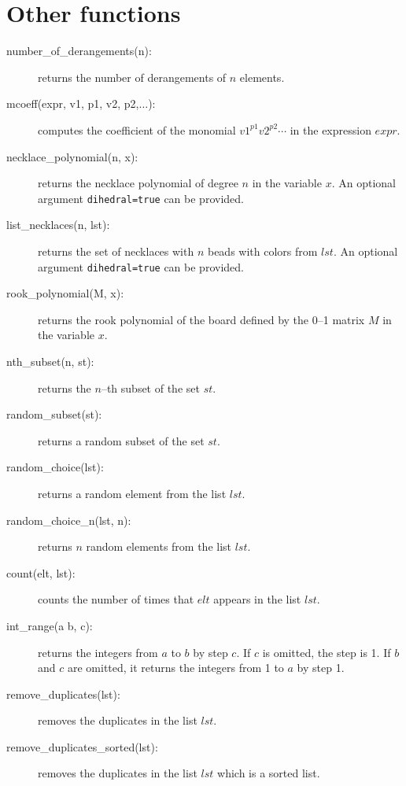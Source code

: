 \documentclass[11pt]{article}
\begin{document}
\section{Other functions}

\begin{description}
  \item [number\_of\_derangements(n):] returns the number of
    derangements of $n$ elements.
  \item [mcoeff(expr, v1, p1, v2, p2,$\ldots$):] computes the
    coefficient of the monomial $v1^{p1}v2^{p2}\cdots$ in the
    expression $expr$.
  \item [necklace\_polynomial(n, x):] returns the necklace polynomial
    of degree $n$ in the variable $x$. An optional argument
    \texttt{dihedral=true} can be provided.
  \item [list\_necklaces(n, lst):] returns the set of necklaces with
    $n$ beads with colors from $lst$. An optional argument
    \texttt{dihedral=true} can be provided.
  \item [rook\_polynomial(M, x):] returns the rook polynomial of the
    board defined by the 0--1 matrix $M$ in the variable $x$.
  \item [nth\_subset(n, st):] returns the $n$--th subset of the set
    $st$.
  \item [random\_subset(st):] returns a random subset of the set $st$.
  \item [random\_choice(lst):] returns a random element from the list
    $lst$.
  \item [random\_choice\_n(lst, n):] returns $n$ random elements from
    the list $lst$.
  \item [count(elt, lst):] counts the number of times that $elt$
    appears in the list $lst$.
  \item [int\_range(a b, c):] returns the integers from $a$ to $b$ by
    step $c$. If $c$ is omitted, the step is 1. If $b$ and $c$ are
    omitted, it returns the integers from 1 to $a$ by step 1.
  \item[remove\_duplicates(lst):] removes the duplicates in the
    list $lst$.
  \item[remove\_duplicates\_sorted(lst):] removes the duplicates
    in the list $lst$ which is a sorted list.
\end{description}
\end{document}
